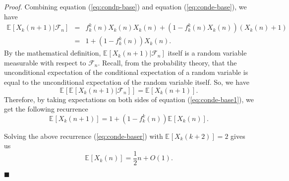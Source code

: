 \documentclass[11pt]{article}
\providecommand{\expectation}[2]{\mathbb{E}_{#2}\left[#1\right]}
\newenvironment{proof}[0]{\textit{Proof.} }{\hfill  $\blacksquare$ }
\providecommand{\vcprob}[3]{f^{#1}_{#2}(#3)}
\providecommand{\tdeg}[2]{X_{#1}(#2)}
\providecommand{\edeg}[2]{\expectation{\tdeg{#1}{#2}}{}}
\begin{document}
\begin{proof}
Combining equation (\ref{eq:condp-base}) and equation (\ref{eq:conde-base}), we have
\begin{eqnarray}
\label{eq:conde-base1}
\expectation{\tdeg{k}{n + 1}| \mathcal{F}_n}{} &=& \vcprob{k}{k}{n}\tdeg{k}{n} \tdeg{k}{n} + (1 - \vcprob{k}{k}{n}\tdeg{k}{n})(\tdeg{k}{n} + 1) \nonumber\\
              &=& 1 + (1 - \vcprob{k}{k}{n}) \tdeg{k}{n}. 
\end{eqnarray}
By the mathematical definition, $\expectation{\tdeg{k}{n + 1}| \mathcal{F}_n}{}$ itself
is a random variable measurable with respect to $\mathcal{F}_n$. 
Recall, from the probability theory, that the unconditional
expectation of the conditional expectation of a random variable is equal to the 
unconditional expectation of the random variable itself. So, we have
$$
\expectation{\expectation{\tdeg{k}{n + 1}| \mathcal{F}_n}{}}{} = \edeg{k}{n + 1}.
$$
Therefore, by taking expectations on both sides of equation
(\ref{eq:conde-base1}), we get the following recurrence 
\begin{equation}
\label{eq:conde-baser} 
\edeg{k}{n + 1}  = 1 + (1 - \vcprob{k}{k}{n}) \edeg{k}{n}.
\end{equation}

Solving the above recurrence (\ref{eq:conde-baser}) with $\edeg{k}{k+2} = 2$ gives us
\begin{equation}
\label{eq-formula-base}
\edeg{k}{n} =  \frac{1}{2}n + O(1).
\end{equation}


\end{proof}
\end{document}
